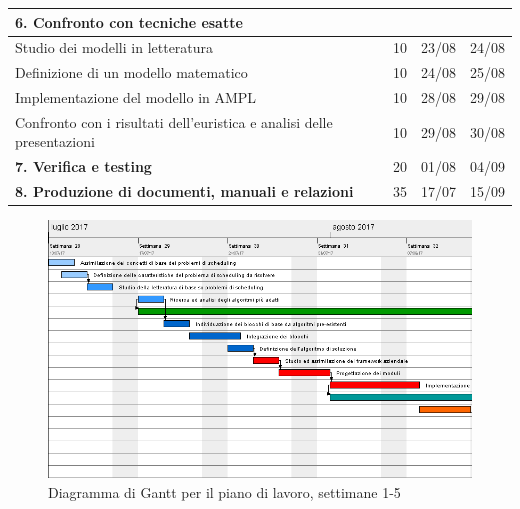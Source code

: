 \begin{table}[!htb]
\begin{tabularx}{\textwidth}{|X|c|c|c|}
        \hline \hline
        \multicolumn{4}{|l|}{\textbf{6. Confronto con tecniche esatte}}\\
        \hline
        Studio dei modelli in letteratura & 10 & 23/08 & 24/08\\
        \hline
        Definizione di un modello matematico & 10 & 24/08 & 25/08\\
        \hline
        Implementazione del modello in AMPL & 10 & 28/08 & 29/08\\
        \hline
        Confronto con i risultati dell'euristica e analisi delle presentazioni & 10 & 29/08 & 30/08\\
        
        \hline \hline
        \textbf{7. Verifica e testing} & 20 & 01/08 & 04/09\\
        
        \hline \hline
        \textbf{8. Produzione di documenti, manuali e relazioni} & 35 & 17/07 & 15/09\\
        \hline
        
    \end{tabularx}
\end{table}%
\clearpage
\begin{figure}[!h]
    \begin{widepage}
    \includegraphics[width=14.9cm,keepaspectratio]{../immagini/pdp_1.png}
    \caption{Diagramma di Gantt per il piano di lavoro, settimane 1-5}
    \end{widepage}
\end{figure}
